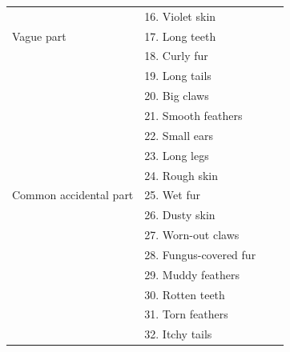 \documentclass[10pt,letterpaper]{article}
\begin{document}
\begin{table}[h]
\begin{tabular}{| l || l | l | l |}
                                          & 16. Violet skin                      &                &                     \\       
Vague part      	 & 17. Long teeth       &                &                     \\
                                          & 18. Curly fur                       &                &                     \\
                                          & 19. Long tails                         &                &                     \\
                                          & 20. Big claws                       &                &                     \\
                                          & 21. Smooth feathers                      &                &                     \\
                                          & 22. Small ears                    &                &                     \\
                                          & 23. Long legs                       &                &                     \\
                                          & 24. Rough skin                      &                &                     \\ 
Common accidental part    & 25. Wet fur       &                &                     \\
                                          & 26. Dusty skin                       &                &                     \\
                                          & 27. Worn-out claws                         &                &                     \\
                                          & 28. Fungus-covered fur                      &                &                     \\
                                          & 29. Muddy feathers                      &                &                     \\
                                          & 30. Rotten teeth                   &                &                     \\
                                          & 31. Torn feathers                       &                &                     \\
                                          & 32. Itchy tails                      &                &                     \\  

\end{tabular}
\end{table}
\end{document}
